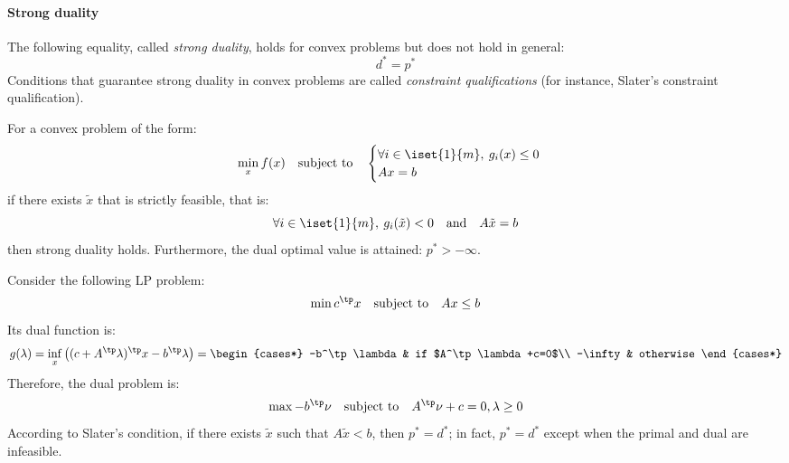 \paragraph*{Strong duality}
The following equality, called \emph{strong duality}, holds for convex problems but does not hold in general:
\begin{equation*}
    d^*=p^*
\end{equation*}
Conditions that guarantee strong duality in convex problems are called \emph{constraint qualifications} (for instance, Slater's constraint qualification).

\begin{theorem}
    For a convex problem of the form:
    \begin{equation*}
        \min_x f(x) \quad\text{subject to}\quad \begin{cases}
            \forall i\in\iset{1}{m}, \: g_i(x)\leq0\\
            Ax = b
        \end{cases}
    \end{equation*}
    if there exists $\tilde{x}$ that is strictly feasible, that is:
    \begin{equation*}
        \forall i\in\iset{1}{m}, \: g_i(\tilde{x})<0 \quad\text{and}\quad A\tilde{x}=b
    \end{equation*}
    then strong duality holds. Furthermore, the dual optimal value is attained: $p^*>-\infty$.
\end{theorem}

\begin{example}
    Consider the following LP problem:
    \begin{equation*}
        \min c^\tp x \quad\text{subject to}\quad Ax\leq b
    \end{equation*}
    Its dual function is:
    \begin{equation*}
        g(\lambda) = \inf_x \left((c+A^\tp\lambda)^\tp x - b^\tp\lambda\right) = \begin{cases*}
            -b^\tp\lambda & if $A^\tp\lambda+c=0$\\
            -\infty & otherwise
        \end{cases*}
    \end{equation*}
    Therefore, the dual problem is:
    \begin{equation*}
        \max -b^\tp\nu \quad\text{subject to}\quad A^\tp\nu+c=0, \lambda\geq0
    \end{equation*}
    According to Slater's condition, if there exists $\tilde{x}$ such that $A\tilde{x}<b$, then $p^*=d^*$; in fact, $p^*=d^*$ except when the primal and dual are infeasible.
\end{example}

